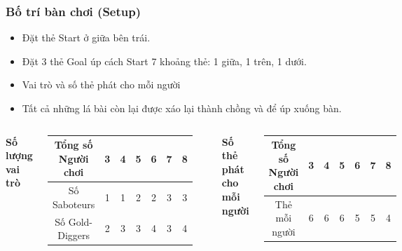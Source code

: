 \begin{frame}
\frametitle{Bố trí bàn chơi (Setup)}
\begin{itemize}
    \item Đặt thẻ Start ở giữa bên trái.
    \item Đặt 3 thẻ Goal úp cách Start 7 khoảng thẻ: 1 giữa, 1 trên, 1 dưới.
    \item Vai trò và số thẻ phát cho mỗi người
    \item Tất cả những lá bài còn lại được xáo lại thành chồng và để úp xuống bàn.
\end{itemize}
\begin{columns}
    \textbf{Số lượng vai trò}
    \begin{table}[h]
    \centering
        \begin{tabular}{|c|c|c|c|c|c|c|}
        \hline
        Tổng số Người chơi & 3 & 4 & 5 & 6 & 7 & 8  \\ \hline
        Số Saboteurs     & 1 & 1 & 2 & 2 & 3 & 3 \\ \hline
        Số Gold-Diggers  & 2 & 3 & 3 & 4 & 3 & 4  \\ \hline
        \end{tabular}
        \label{tab:total-roles}
    \end{table}

    \textbf{Số thẻ phát cho mỗi người}
    \begin{table}[h]
    \centering
        \begin{tabular}{|c|c|c|c|c|c|c|}
        \hline
        Tổng số Người chơi      & 3 & 4 & 5 & 6 & 7 & 8 \\ \hline
        Thẻ mỗi người      & 6 & 6 & 6 & 5 & 5 & 4 \\ \hline
        \end{tabular}
        \label{tab:cards-per-player}
    \end{table}
\end{columns}

\end{frame}


